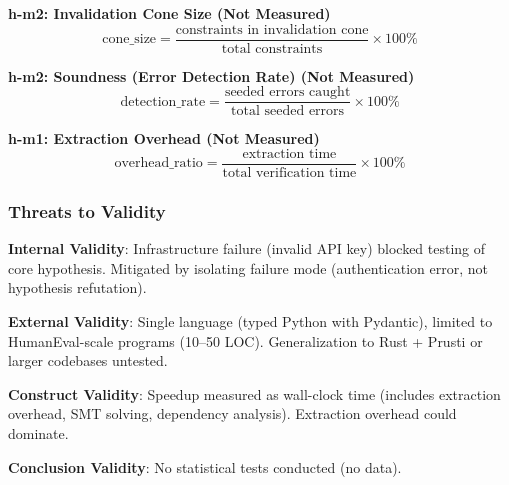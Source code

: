 \textbf{h-m2: Invalidation Cone Size (Not Measured)}
$$\text{cone\_size} = \frac{\text{constraints in invalidation cone}}{\text{total constraints}} \times 100\%$$

\textbf{h-m2: Soundness (Error Detection Rate) (Not Measured)}
$$\text{detection\_rate} = \frac{\text{seeded errors caught}}{\text{total seeded errors}} \times 100\%$$

\textbf{h-m1: Extraction Overhead (Not Measured)}
$$\text{overhead\_ratio} = \frac{\text{extraction time}}{\text{total verification time}} \times 100\%$$

\subsubsection{Threats to Validity}

\textbf{Internal Validity}: Infrastructure failure (invalid API key) blocked testing of core hypothesis. Mitigated by isolating failure mode (authentication error, not hypothesis refutation).

\textbf{External Validity}: Single language (typed Python with Pydantic), limited to HumanEval-scale programs (10--50 LOC). Generalization to Rust + Prusti or larger codebases untested.

\textbf{Construct Validity}: Speedup measured as wall-clock time (includes extraction overhead, SMT solving, dependency analysis). Extraction overhead could dominate.

\textbf{Conclusion Validity}: No statistical tests conducted (no data).
